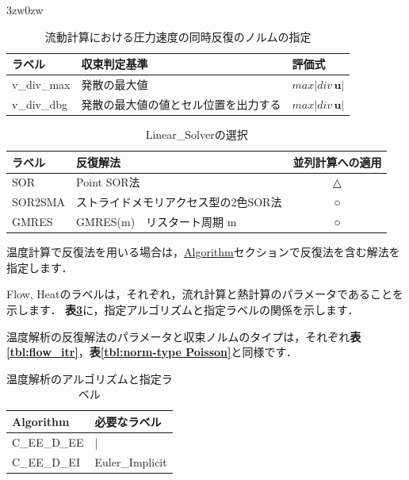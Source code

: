 \begin{indentation}{3zw}{0zw}
\begin{table}[htdp]
\caption{流動計算における圧力速度の同時反復のノルムの指定}
\begin{center}
\small
\begin{tabular}{lll} \toprule
ラベル & 収束判定基準 & 評価式\\ \midrule 
v\_div\_max & 発散の最大値 & $max\left|div\,\bm{u}\right|$\\
\vspace{2mm}
v\_div\_dbg & 発散の最大値の値とセル位置を出力する\footnotemark[1] & $max\left|div\,\bm{u}\right|$\\
\bottomrule
\end{tabular}
\end{center}
\label{tbl:norm-type VP}
\end{table}


\begin{table}[htdp]
\caption{Linear\_Solverの選択}
\begin{center}
\small
\begin{tabular}{llc} \toprule
ラベル & 反復解法 & 並列計算への適用\\ \midrule
SOR & Point SOR法 & △\\
SOR2SMA & ストライドメモリアクセス型の2色SOR法 & ○\\ 
GMRES & GMRES(m)　リスタート周期 m & ○\\ 
\bottomrule
\end{tabular}
\end{center}
\label{tbl:LS}
\end{table}




温度計算で反復法を用いる場合は，\hyperlink{tgt:algorithm}{Algorithm}セクションで反復法を含む解法を指定します．

Flow, Heatのラベルは，それぞれ，流れ計算と熱計算のパラメータであることを示します．
\textbf{表\ref{tbl:itr_temp_algo}}に，指定アルゴリズムと指定ラベルの関係を示します．

温度解析の反復解法のパラメータと収束ノルムのタイプは，それぞれ\textbf{表\ref{tbl:flow_itr}}，\textbf{表\ref{tbl:norm-type Poisson}}と同様です．

\begin{table}[htdp]
\caption{温度解析のアルゴリズムと指定ラベル}
\begin{center}
\small
\begin{tabular}{ll} \toprule
Algorithm &  必要なラベル\\ \midrule
C\_EE\_D\_EE & | \\
C\_EE\_D\_EI & Euler\_Implicit\\ \bottomrule
\end{tabular}
\end{center}
\label{tbl:itr_temp_algo}
\end{table}

\end{indentation}



